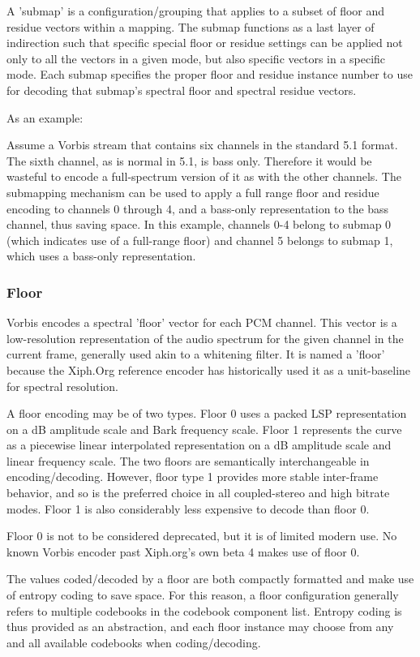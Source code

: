 A 'submap' is a configuration/grouping that applies to a subset of
floor and residue vectors within a mapping.  The submap functions as a
last layer of indirection such that specific special floor or residue
settings can be applied not only to all the vectors in a given mode,
but also specific vectors in a specific mode.  Each submap specifies
the proper floor and residue instance number to use for decoding that
submap's spectral floor and spectral residue vectors.

As an example:

Assume a Vorbis stream that contains six channels in the standard 5.1
format.  The sixth channel, as is normal in 5.1, is bass only.
Therefore it would be wasteful to encode a full-spectrum version of it
as with the other channels.  The submapping mechanism can be used to
apply a full range floor and residue encoding to channels 0 through 4,
and a bass-only representation to the bass channel, thus saving space.
In this example, channels 0-4 belong to submap 0 (which indicates use
of a full-range floor) and channel 5 belongs to submap 1, which uses a
bass-only representation.


\subsubsection{Floor}

Vorbis encodes a spectral 'floor' vector for each PCM channel.  This
vector is a low-resolution representation of the audio spectrum for
the given channel in the current frame, generally used akin to a
whitening filter.  It is named a 'floor' because the Xiph.Org
reference encoder has historically used it as a unit-baseline for
spectral resolution.

A floor encoding may be of two types.  Floor 0 uses a packed LSP
representation on a dB amplitude scale and Bark frequency scale.
Floor 1 represents the curve as a piecewise linear interpolated
representation on a dB amplitude scale and linear frequency scale.
The two floors are semantically interchangeable in
encoding/decoding. However, floor type 1 provides more stable
inter-frame behavior, and so is the preferred choice in all
coupled-stereo and high bitrate modes.  Floor 1 is also considerably
less expensive to decode than floor 0.

Floor 0 is not to be considered deprecated, but it is of limited
modern use.  No known Vorbis encoder past Xiph.org's own beta 4 makes
use of floor 0.

The values coded/decoded by a floor are both compactly formatted and
make use of entropy coding to save space.  For this reason, a floor
configuration generally refers to multiple codebooks in the codebook
component list.  Entropy coding is thus provided as an abstraction,
and each floor instance may choose from any and all available
codebooks when coding/decoding.


